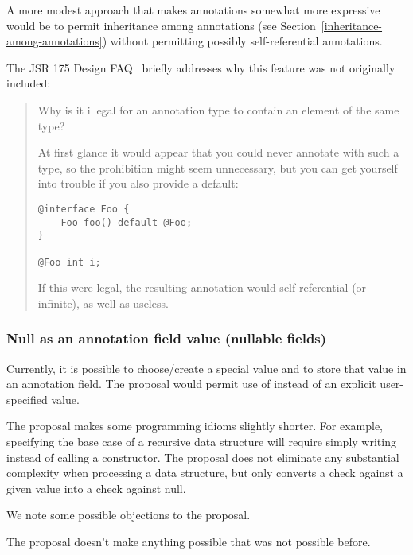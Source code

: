 \documentclass[10pt]{article}
\begin{document}


A more modest approach that makes annotations somewhat more expressive
would be to permit inheritance among annotations (see
Section~\ref{inheritance-among-annotations}) without permitting possibly
self-referential annotations.


The JSR 175 Design FAQ~\cite{JSR175-PFD2} briefly addresses why this
feature was not originally included:

\begin{quote}
  Why is it illegal for an annotation type to contain an element of the same type?

At first glance it would appear that you could never annotate with such a type, so the prohibition might seem unnecessary, but you can get yourself into trouble if you also provide a default:

\begin{Verbatim}
@interface Foo {
    Foo foo() default @Foo;
}

@Foo int i;
\end{Verbatim}

If this were legal, the resulting annotation would self-referential (or infinite), as well as useless.
\end{quote}


\subsubsection{Null as an annotation field value (nullable fields)\label{nullable-members}}

Currently, it is possible to choose/create a special value and to store
that value in an annotation field.
The proposal would permit use of  instead of an explicit
user-specified value.

The proposal makes some programming idioms slightly shorter.  For example,
specifying the base case of a recursive data structure will require simply
writing  instead of calling a constructor.  The proposal does
not eliminate any substantial complexity when processing a data structure,
but only converts a check against a given value into a check against null.

We note some possible objections to the proposal.

The proposal doesn't make anything possible that was not possible before.
\end{document}
